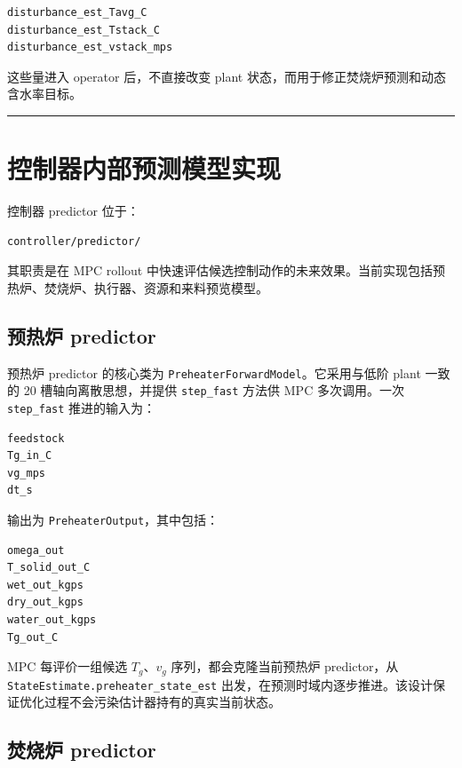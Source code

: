 \documentclass[UTF8,openany,zihao=-4,oneside]{ctexbook}
\providecommand{\passthrough}[1]{#1}
\newcommand{\manualdivider}{\par\vspace{0.6em}\noindent\textcolor{FGLine}{\rule{\linewidth}{0.7pt}}\vspace{0.6em}\par}
\begin{document}
\begin{lstlisting}
disturbance_est_Tavg_C
disturbance_est_Tstack_C
disturbance_est_vstack_mps
\end{lstlisting}

这些量进入 operator 后，不直接改变 plant 状态，而用于修正焚烧炉预测和动态含水率目标。

\manualdivider

\section{控制器内部预测模型实现}\label{sec:controller-predictor-implementation}

控制器 predictor 位于：

\begin{lstlisting}
controller/predictor/
\end{lstlisting}

其职责是在 MPC rollout 中快速评估候选控制动作的未来效果。当前实现包括预热炉、焚烧炉、执行器、资源和来料预览模型。

\subsection{预热炉 predictor}\label{subsec:preheater-predictor-impl}

预热炉 predictor 的核心类为 \passthrough{\lstinline!PreheaterForwardModel!}。它采用与低阶 plant 一致的 20 槽轴向离散思想，并提供 \passthrough{\lstinline!step_fast!} 方法供 MPC 多次调用。一次 \passthrough{\lstinline!step_fast!} 推进的输入为：

\begin{lstlisting}
feedstock
Tg_in_C
vg_mps
dt_s
\end{lstlisting}

输出为 \passthrough{\lstinline!PreheaterOutput!}，其中包括：

\begin{lstlisting}
omega_out
T_solid_out_C
wet_out_kgps
dry_out_kgps
water_out_kgps
Tg_out_C
\end{lstlisting}

MPC 每评价一组候选 \(T_g\)、\(v_g\) 序列，都会克隆当前预热炉 predictor，从 \passthrough{\lstinline!StateEstimate.preheater_state_est!} 出发，在预测时域内逐步推进。该设计保证优化过程不会污染估计器持有的真实当前状态。

\subsection{焚烧炉 predictor}\label{subsec:furnace-predictor-impl}
\end{document}
